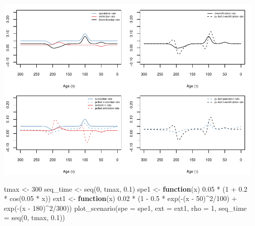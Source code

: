 \documentclass[
]{article}
\newenvironment{Shaded}{\begin{snugshade}}{\end{snugshade}}
\newcommand{\AttributeTok}[1]{\textcolor[rgb]{0.77,0.63,0.00}{#1}}
\newcommand{\ControlFlowTok}[1]{\textcolor[rgb]{0.13,0.29,0.53}{\textbf{#1}}}
\newcommand{\DecValTok}[1]{\textcolor[rgb]{0.00,0.00,0.81}{#1}}
\newcommand{\FloatTok}[1]{\textcolor[rgb]{0.00,0.00,0.81}{#1}}
\newcommand{\FunctionTok}[1]{\textcolor[rgb]{0.00,0.00,0.00}{#1}}
\newcommand{\NormalTok}[1]{#1}
\newcommand{\OtherTok}[1]{\textcolor[rgb]{0.56,0.35,0.01}{#1}}
\newcommand{\SpecialCharTok}[1]{\textcolor[rgb]{0.00,0.00,0.00}{#1}}
\begin{document}
\includegraphics{supplement_files/figure-latex/unnamed-chunk-15-1.pdf}

\pagebreak

\begin{Shaded}
\begin{Highlighting}[]
\NormalTok{tmax }\OtherTok{\textless{}{-}} \DecValTok{300}
\NormalTok{seq\_time }\OtherTok{\textless{}{-}} \FunctionTok{seq}\NormalTok{(}\DecValTok{0}\NormalTok{, tmax, }\FloatTok{0.1}\NormalTok{)}
\NormalTok{spe1 }\OtherTok{\textless{}{-}} \ControlFlowTok{function}\NormalTok{(x) }\FloatTok{0.05} \SpecialCharTok{*}\NormalTok{ (}\DecValTok{1} \SpecialCharTok{+} \FloatTok{0.2} \SpecialCharTok{*} \FunctionTok{cos}\NormalTok{(}\FloatTok{0.05} \SpecialCharTok{*}\NormalTok{ x))}
\NormalTok{ext1 }\OtherTok{\textless{}{-}} \ControlFlowTok{function}\NormalTok{(x) }\FloatTok{0.02} \SpecialCharTok{*}\NormalTok{ (}\DecValTok{1} \SpecialCharTok{{-}} \FloatTok{0.5} \SpecialCharTok{*} \FunctionTok{exp}\NormalTok{(}\SpecialCharTok{{-}}\NormalTok{(x }\SpecialCharTok{{-}} \DecValTok{50}\NormalTok{)}\SpecialCharTok{\^{}}\DecValTok{2}\SpecialCharTok{/}\DecValTok{100}\NormalTok{) }\SpecialCharTok{+}
    \FunctionTok{exp}\NormalTok{(}\SpecialCharTok{{-}}\NormalTok{(x }\SpecialCharTok{{-}} \DecValTok{180}\NormalTok{)}\SpecialCharTok{\^{}}\DecValTok{2}\SpecialCharTok{/}\DecValTok{300}\NormalTok{))}
\FunctionTok{plot\_scenario}\NormalTok{(}\AttributeTok{spe =}\NormalTok{ spe1, }\AttributeTok{ext =}\NormalTok{ ext1, }\AttributeTok{rho =} \DecValTok{1}\NormalTok{, }\AttributeTok{seq\_time =} \FunctionTok{seq}\NormalTok{(}\DecValTok{0}\NormalTok{,}
\NormalTok{    tmax, }\FloatTok{0.1}\NormalTok{))}
\end{Highlighting}
\end{Shaded}
\end{document}
